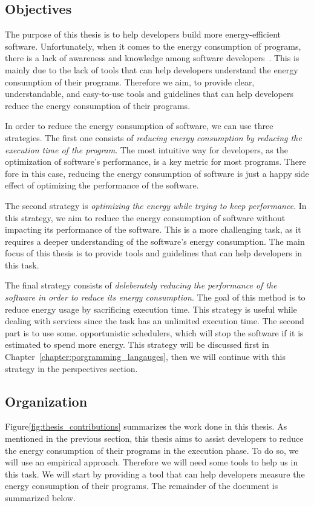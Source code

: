 \subsection*{Objectives}
The purpose of this thesis is to help developers build more energy-efficient software. Unfortunately, when it comes to the energy consumption of programs, there is a lack of awareness and knowledge among software developers~\cite{ournani2020reducing,pang2015programmers,pinto2014mining}. This is mainly due to the lack of tools that can help developers understand the energy consumption of their programs. Therefore we aim, to provide clear, understandable, and easy-to-use tools and guidelines that can help developers reduce the energy consumption of their programs.

In order to reduce the energy consumption of software, we can use three strategies.
The first one consists of \emph{reducing energy consumption by reducing the execution time of the program}. The most intuitive way for developers, as the optimization of software's performance, is a key metric for most programs. There fore in this case, reducing the energy consumption of software is just a happy side effect of optimizing the performance of the software.


The second strategy is \emph{optimizing the energy while trying to keep performance}. In this strategy, we aim to reduce the energy consumption of software without impacting its performance of the software. This is a more challenging task, as it requires a deeper understanding of the software's energy consumption. The main focus of this thesis is to provide tools and guidelines that can help developers in this task.


The final strategy consists of \emph{deleberately reducing the performance of the software in order to reduce its energy consumption}. The goal of this method is to reduce energy usage by sacrificing execution time. This strategy is useful while dealing with services since the task has an unlimited execution time. The second part is to use some. opportunistic schedulers, which will stop the software if it is estimated to spend more energy. This strategy will be discussed first in Chapter~\ref{chapter:porgramming_langauges}, then we will continue with this strategy in the perspectives section.



\subsection*{Organization}
Figure\ref{fig:thesis_contributions} summarizes the work done in this thesis. As mentioned in the previous section, this thesis aims to assist developers to reduce the energy consumption of their programs in the execution phase. To do so, we will use an empirical approach. Therefore we will need some tools to help us in this task. We will start by providing a tool that can help developers measure the energy consumption of their programs. The remainder of the document is summarized below.

